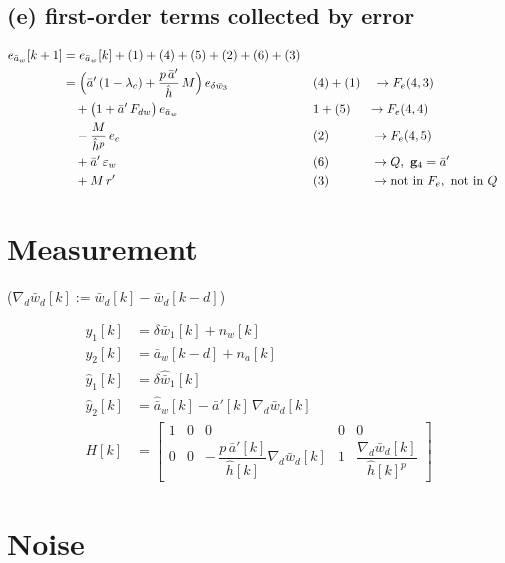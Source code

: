 \documentclass[11pt,a4paper,fontset=none]{ctexart}
\newcommand{\ba}{\bar{a}}
\newcommand{\bw}{\bar{w}}
\newcommand{\ap}{\ba'}
\newcommand{\ah}{\hat{\ba}_w}
\newcommand{\hh}{\hat{h}}
\begin{document}
\subsection*{(e) first-order terms collected by error}

\begin{align*}
e_{\ba_w}[k+1]
  &= e_{\ba_w}[k] + (1) + (4) + (5) + (2) + (6) + (3) \\
  &= \Bigl(\ap\,(1-\lambda_c) + \frac{p\,\ap}{\hh}\,M\Bigr)\,e_{\delta\bw_3}      && (4) + (1) \quad \to F_e(4,3) \\
  &\quad + \bigl(1 + \ap\,F_{dw}\bigr)\,e_{\ba_w}                                 && 1 + (5) \quad\ \to F_e(4,4) \\
  &\quad - \frac{M}{\hh^{p}}\,e_c                                                 && (2) \qquad\quad\ \to F_e(4,5) \\
  &\quad + \ap\,\varepsilon_w                                                     && (6) \qquad\quad\ \to Q,\ \mathbf{g}_4 = \ap \\
  &\quad + M\,r'                                                                  && (3) \qquad\quad\ \to \text{not in } F_e,\ \text{not in } Q
\end{align*}

\newpage
\section{Measurement}

($\nabla_d\bw_d[k] := \bw_d[k] - \bw_d[k-d]$)

\begin{align*}
y_1[k]      &= \delta\bw_1[k] + n_w[k] \\
y_2[k]      &= \ba_w[k-d] + n_a[k] \\
\hat y_1[k] &= \delta\hat{\bw}_1[k] \\
\hat y_2[k] &= \ah[k] - \ap[k]\,\nabla_d\bw_d[k] \\[4pt]
H[k]        &= \begin{bmatrix} 1 & 0 & 0 & 0 & 0 \\[2pt]
               0 & 0 & -\,\dfrac{p\,\ap[k]}{\hh[k]}\nabla_d\bw_d[k] & 1 & \dfrac{\nabla_d\bw_d[k]}{\hh[k]^{p}} \end{bmatrix}
\end{align*}

\section{Noise}
\end{document}
